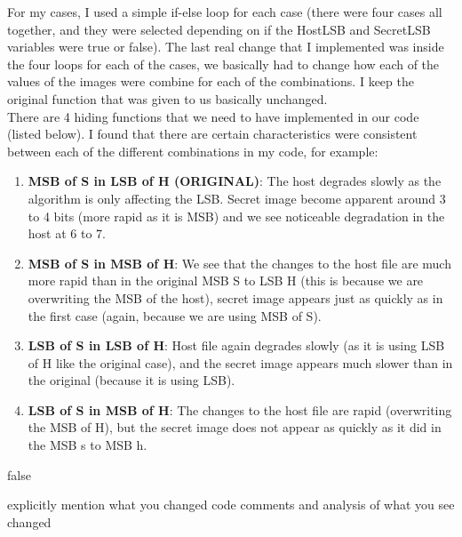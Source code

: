 \documentclass[10pt]{article}
\begin{document}
 For my cases, I used a simple if-else loop for each case  (there were four cases all together, and they were selected depending on if the HostLSB and SecretLSB variables were true or false). The last real change that I implemented was inside the four loops for each of the cases, we basically had to change how each of the values of the images were combine for each of the combinations. I keep the original function that was given to us basically unchanged.\\
 \newline
 There are 4 hiding functions that we need to have implemented in our code (listed below). I found that there are certain characteristics were consistent between each of the different combinations in my code, for example: 
 \begin{enumerate}
 	\item \textbf{MSB of S in LSB of H (ORIGINAL)}: The host degrades slowly as the algorithm is only affecting the LSB. Secret image become apparent around 3 to 4 bits (more rapid as it is MSB) and we see noticeable degradation in the host at 6 to 7. 
 	\item \textbf{MSB of S in MSB of H}: We see that the changes to the host file are much more rapid than in the original MSB S to LSB H (this is because we are overwriting the MSB of the host), secret image appears just as quickly as in the first case (again, because we are using MSB of S).
 	\item \textbf{LSB of S in LSB of H}: Host file again degrades slowly (as it is using LSB of H like the original case), and the secret image appears much slower than in the original (because it is using LSB).
 	\item \textbf{LSB of S in MSB of H}: The changes to the host file are rapid (overwriting the MSB of H), but the secret image does not appear as quickly as it did in the MSB s to MSB h.
\end{enumerate}

\vspace{0.2in} 



\if false

explicitly mention what you changed
code comments
and analysis of what you see changed
\end{document}
